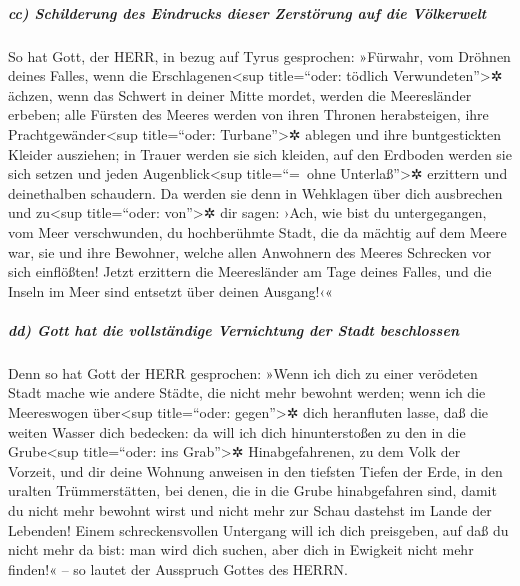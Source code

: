 \hypertarget{cc-schilderung-des-eindrucks-dieser-zerstuxf6rung-auf-die-vuxf6lkerwelt}{%
\subparagraph{cc) Schilderung des Eindrucks dieser Zerstörung auf die
Völkerwelt}\label{cc-schilderung-des-eindrucks-dieser-zerstuxf6rung-auf-die-vuxf6lkerwelt}}

So hat Gott, der HERR, in bezug auf Tyrus gesprochen:
»Fürwahr, vom Dröhnen deines Falles, wenn die Erschlagenen\textless sup
title=``oder: tödlich Verwundeten''\textgreater✲ ächzen, wenn das
Schwert in deiner Mitte mordet, werden die Meeresländer erbeben;
alle Fürsten des Meeres werden von ihren Thronen
herabsteigen, ihre Prachtgewänder\textless sup title=``oder:
Turbane''\textgreater✲ ablegen und ihre buntgestickten Kleider
ausziehen; in Trauer werden sie sich kleiden, auf den Erdboden werden
sie sich setzen und jeden Augenblick\textless sup title=``=~ohne
Unterlaß''\textgreater✲ erzittern und deinethalben schaudern.
Da werden sie denn in Wehklagen über dich ausbrechen und
zu\textless sup title=``oder: von''\textgreater✲ dir sagen: ›Ach, wie
bist du untergegangen, vom Meer verschwunden, du hochberühmte Stadt, die
da mächtig auf dem Meere war, sie und ihre Bewohner, welche allen
Anwohnern des Meeres Schrecken vor sich einflößten! Jetzt
erzittern die Meeresländer am Tage deines Falles, und die Inseln im Meer
sind entsetzt über deinen Ausgang!‹«

\hypertarget{dd-gott-hat-die-vollstuxe4ndige-vernichtung-der-stadt-beschlossen}{%
\subparagraph{dd) Gott hat die vollständige Vernichtung der Stadt
beschlossen}\label{dd-gott-hat-die-vollstuxe4ndige-vernichtung-der-stadt-beschlossen}}

Denn so hat Gott der HERR gesprochen: »Wenn ich dich zu
einer verödeten Stadt mache wie andere Städte, die nicht mehr bewohnt
werden; wenn ich die Meereswogen über\textless sup title=``oder:
gegen''\textgreater✲ dich heranfluten lasse, daß die weiten Wasser dich
bedecken: da will ich dich hinunterstoßen zu den in die
Grube\textless sup title=``oder: ins Grab''\textgreater✲
Hinabgefahrenen, zu dem Volk der Vorzeit, und dir deine Wohnung anweisen
in den tiefsten Tiefen der Erde, in den uralten Trümmerstätten, bei
denen, die in die Grube hinabgefahren sind, damit du nicht mehr bewohnt
wirst und nicht mehr zur Schau dastehst im Lande der Lebenden!
Einem schreckensvollen Untergang will ich dich
preisgeben, auf daß du nicht mehr da bist: man wird dich suchen, aber
dich in Ewigkeit nicht mehr finden!« -- so lautet der Ausspruch Gottes
des HERRN.

